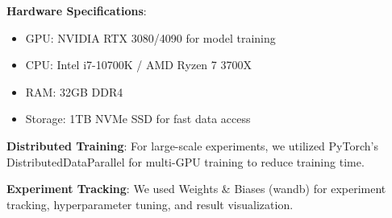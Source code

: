 \textbf{Hardware Specifications}:
\begin{itemize}
    \item GPU: NVIDIA RTX 3080/4090 for model training
    \item CPU: Intel i7-10700K / AMD Ryzen 7 3700X
    \item RAM: 32GB DDR4
    \item Storage: 1TB NVMe SSD for fast data access
\end{itemize}

\textbf{Distributed Training}: For large-scale experiments, we utilized PyTorch's DistributedDataParallel for multi-GPU training to reduce training time.

\textbf{Experiment Tracking}: We used Weights & Biases (wandb) for experiment tracking, hyperparameter tuning, and result visualization.
